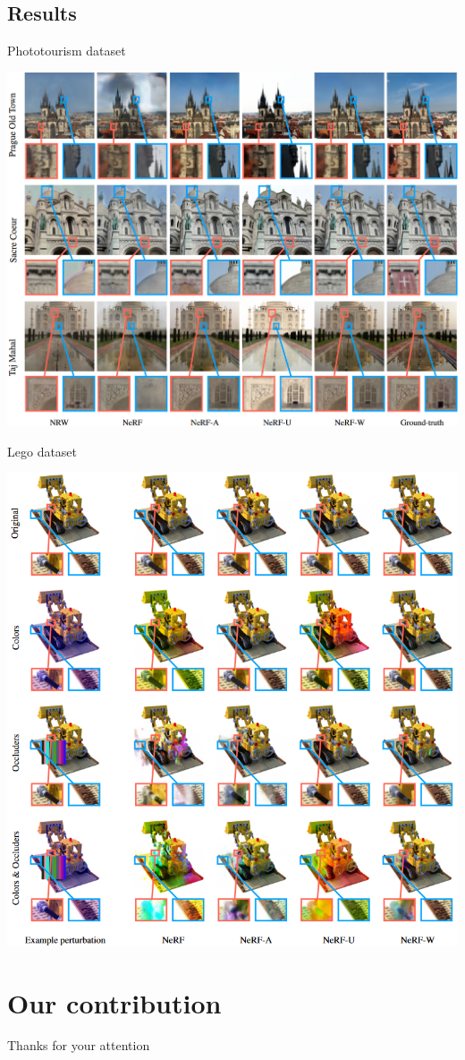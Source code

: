 \documentclass[aspectratio=1610,handout]{beamer}
\begin{document}
\subsection{Results}
\begin{frame}{Phototourism dataset}
    \begin{center}
        \includegraphics[width=.7\textwidth]{res-photo.png}
    \end{center}
\end{frame}
\begin{frame}{Lego dataset}
    \begin{center}
        \includegraphics[width=.51\textwidth]{results-lego.png}
    \end{center}
\end{frame}

\section{Our contribution}
\begin{frame}
    \begin{center}
        Thanks for your attention
    \end{center}
\end{frame}
\end{document}
